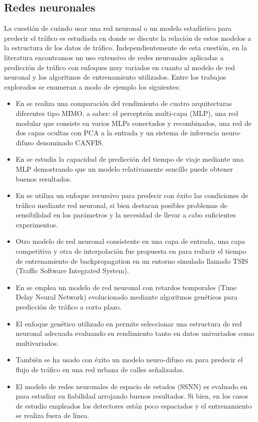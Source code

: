 \documentclass{llncs}
\begin{document}
\subsection{Redes neuronales}
La cuestión de cuándo usar una red neuronal o un modelo estadístico para predecir el tráfico es estudiada en \cite{kirby1997should} donde se discute la relación de estos modelos a la estructura de los datos de tráfico. Independientemente de esta cuestión, en la literatura encontramos un uso extensivo de redes neuronales aplicadas a predicción de tráfico con enfoques muy variados en cuanto al modelo de red neuronal y los algoritmos de entrenamiento utilizados. Entre los trabajos explorados se enumeran a modo de ejemplo los siguientes:

\begin{itemize}
\item En \cite{Ishak2004452} se realiza una comparación del rendimiento de cuatro arquitecturas diferentes tipo MIMO, a saber: el perceptrón multi-capa (MLP), una red modular que consiste en varios MLPs conectados y recombinados, una red de dos capas ocultas con PCA a la entrada y un sistema de inferencia neuro-difuso denominado CANFIS.
\item En \cite{Innamaa2005649} se estudia la capacidad de predicción del tiempo de viaje mediante una MLP demostrando que un modelo relativamente sencillo puede obtener buenos resultados.
\item En \cite{Zhang2000472} se utiliza un enfoque recursivo para predecir con éxito las condiciones de tráfico mediante red neuronal, si bien destacan posibles problemas de sensibilidad en los parámetros y la necesidad de llevar a cabo suficientes experimentos.
\item Otro modelo de red neuronal consistente en una capa de entrada, una capa competitiva y otra de interpolación fue  propuesta en \cite{Dharia2003607} para reducir el tiempo de entrenamiento de backpropagation en un entorno simulado llamado TSIS (Traffic Software Integrated System). 
\item En \cite{abdulhai2002short} se emplea un modelo de red neuronal con retardos temporales (Time Delay Neural Network) evolucionado mediante algoritmos genéticos para predicción de tráfico a corto plazo.
\item El enfoque genético utilizado en \cite{vlahogianni2005optimized} permite seleccionar una estructura de red neuronal adecuada evaluando su rendimiento tanto en datos univariados como multivariados.
\item También se ha usado con éxito un modelo neuro-difuso en \cite{yin2002urban} para predecir el flujo de tráfico en una red urbana de calles señalizadas.
\item El modelo de redes neuronales de espacio de estados (SSNN) es evaluado en \cite{van2006reliable} para estudiar su fiabilidad arrojando buenos resultados. Si bien, en los casos de estudio empleados los detectores están poco espaciados y el entrenamiento se realiza fuera de línea.
\end{itemize}
\end{document}
